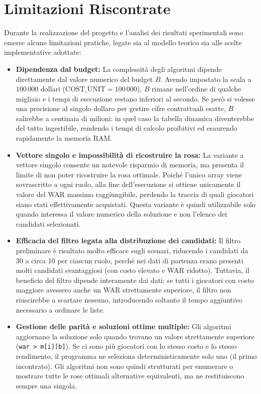 \section{Limitazioni Riscontrate}
Durante la realizzazione del progetto e l'analisi dei risultati sperimentali sono emerse alcune limitazioni pratiche, legate sia al modello teorico sia alle scelte implementative adottate:

\begin{itemize}
	\item \textbf{Dipendenza dal budget:} La complessità degli algoritmi dipende direttamente dal valore numerico del budget $B$. Avendo impostato la scala a $100\,000$ dollari ($\text{COST\_UNIT} = 100\,000$), $B$ rimane nell'ordine di qualche migliaio e i tempi di esecuzione restano inferiori al secondo. Se però si volesse una precisione al singolo dollaro per gestire cifre contrattuali esatte, $B$ salirebbe a centinaia di milioni: in quel caso la tabella dinamica diventerebbe del tutto ingestibile, rendendo i tempi di calcolo proibitivi ed esaurendo rapidamente la memoria RAM.

	\item \textbf{Vettore singolo e impossibilità di ricostruire la rosa:} La variante a vettore singolo consente un notevole risparmio di memoria, ma presenta il limite di non poter ricostruire la rosa ottimale. Poiché l'unico array viene sovrascritto a ogni ruolo, alla fine dell'esecuzione si ottiene unicamente il valore del WAR massimo raggiungibile, perdendo la traccia di quali giocatori siano stati effettivamente acquistati. Questa variante è quindi utilizzabile solo quando interessa il valore numerico della soluzione e non l'elenco dei candidati selezionati.

	\item \textbf{Efficacia del filtro legata alla distribuzione dei candidati:} Il filtro preliminare è risultato molto efficace sugli scenari, riducendo i candidati da 30 a circa 10 per ciascun ruolo, perché nei dati di partenza erano presenti molti candidati svantaggiosi (con costo elevato e WAR ridotto). Tuttavia, il beneficio del filtro dipende interamente dai dati: se tutti i giocatori con costo maggiore avessero anche un WAR strettamente superiore, il filtro non riuscirebbe a scartare nessuno, introducendo soltanto il tempo aggiuntivo necessario a ordinare le liste.

	\item \textbf{Gestione delle parità e soluzioni ottime multiple:} Gli algoritmi aggiornano la soluzione solo quando trovano un valore strettamente superiore (\texttt{war > m[i][b]}). Se ci sono più giocatori con lo stesso costo e lo stesso rendimento, il programma ne seleziona deterministicamente solo uno (il primo incontrato). Gli algoritmi non sono quindi strutturati per enumerare o mostrare tutte le rose ottimali alternative equivalenti, ma ne restituiscono sempre una singola.
\end{itemize}

\newpage
